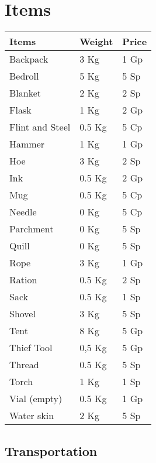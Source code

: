 \chapter{Items}


\begin{tabular}{|l|l|l|}\hline
\rowcolor{gray!50}
    \textbf{Items}  &\textbf{Weight}    &\textbf{Price} \\ \hline
    Backpack        & 3 Kg    & 1 Gp\\
    Bedroll         & 5 Kg    & 5 Sp\\
    Blanket         & 2 Kg    & 2 Sp\\
    Flask           & 1 Kg    & 2 Gp\\
    Flint and Steel & 0.5 Kg  & 5 Cp\\
    Hammer          & 1 Kg    & 1 Gp\\
    Hoe             & 3 Kg    & 2 Sp\\
    Ink             & 0.5 Kg  & 2 Gp\\
    Mug             & 0.5 Kg  & 5 Cp\\
    Needle          & 0 Kg    & 5 Cp\\
    Parchment       & 0 Kg    & 5 Sp\\
    Quill           & 0 Kg    & 5 Sp\\
    Rope            & 3 Kg    & 1 Gp\\
    Ration          & 0.5 Kg  & 2 Sp\\
    Sack            & 0.5 Kg  & 1 Sp\\
    Shovel          & 3 Kg    & 5 Sp\\
    Tent            & 8 Kg    & 5 Gp\\
    Thief Tool      & 0,5 Kg  & 5 Gp\\
    Thread          & 0.5 Kg  & 5 Sp\\
    Torch           & 1 Kg    & 1 Sp\\
    Vial (empty)    & 0.5 Kg  & 1 Gp\\
    Water skin      & 2 Kg    & 5 Sp\\
    \hline
\end{tabular}

\section{Transportation}
